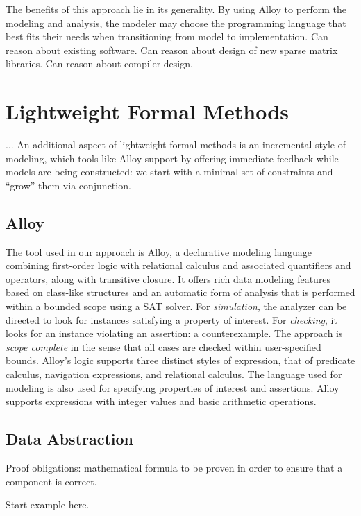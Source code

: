 \documentclass[11pt,conference]{IEEEtran}
\begin{document}
The benefits of this approach lie in its generality.  By using Alloy to perform the modeling and analysis, the modeler may choose the programming language that best fits their needs when transitioning from model to implementation.
Can reason about existing software.
Can reason about design of new sparse matrix libraries.
Can reason about compiler design.

\section{Lightweight Formal Methods}

...
An additional aspect of lightweight formal methods is an incremental style of modeling, which tools like Alloy support by offering immediate feedback while models are being constructed: we start with a minimal set of constraints and ``grow'' them via conjunction.

\subsection{Alloy}

The tool used in our approach is Alloy, a declarative modeling language combining first-order logic with relational calculus and associated quantifiers and operators, along with transitive closure.  It offers rich data modeling features based on class-like structures and an automatic form of analysis that is performed within a bounded scope using a SAT solver.  For \emph{simulation}, the analyzer can be directed to look for instances satisfying a property of interest.  For \emph{checking}, it looks for an instance violating an assertion: a counterexample.  The approach is \emph{scope complete} in the sense that all cases are checked within user-specified bounds.  Alloy's logic supports three distinct styles of expression, that of predicate calculus, navigation expressions, and relational calculus.  The language used for modeling is also used for specifying properties of interest and assertions.  Alloy supports expressions with integer values and basic arithmetic operations.

\subsection{Data Abstraction}

Proof obligations: mathematical formula to be proven in order to ensure that a component is correct.

Start example here.
\end{document}
